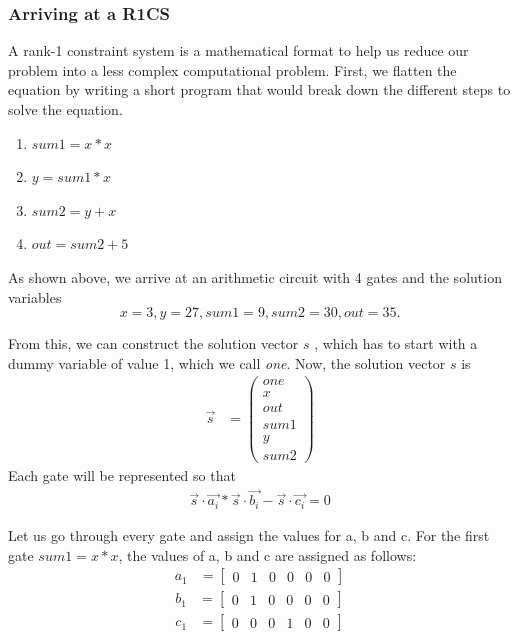 \subsubsection{Arriving at a R1CS}

A rank-1 constraint system is a mathematical format to help us reduce our problem into a less complex computational problem. First, we flatten the equation by writing a short program that would break down the different steps to solve the equation.

\begin{enumerate}
    \item \(sum1 = x * x\)
    \item \(y = sum1 * x\)
    \item \(sum2 = y + x\)
    \item \(out = sum2 + 5\)
\end{enumerate}

As shown above, we arrive at an arithmetic circuit with 4 gates and the solution variables
\[x = 3, y = 27, sum1 = 9, sum2 = 30, out = 35.\]

From this, we can construct the solution vector \(s\) , which has to start with a dummy variable of value 1, which we call \textit{one}.
Now, the solution vector \(s\) is
\begin{align}
    \Vec{s} &= \begin{pmatrix}
     one \\ x \\ out \\ sum1 \\ y \\ sum2
\end{pmatrix}
\end{align}
Each gate will be represented so that
\begin{align}
     \Vec{s}\cdot\Vec{a_i} * \Vec{s}\cdot\Vec{b_i} - \Vec{s}\cdot\Vec{c_i} = 0
\end{align}

Let us go through every gate and assign the values for a, b and c.
For the first gate \(sum1 = x*x\), the values of a, b and c are assigned as follows:
\begin{align*}
    a_1 &=\begin{bmatrix}
        0 & 1 & 0 & 0 & 0 & 0
    \end{bmatrix}
\end{align*}
\begin{align*}
    b_1&=\begin{bmatrix}
        0 & 1 & 0 & 0 & 0 & 0 
    \end{bmatrix}
\end{align*}
\begin{align*}
    c_1&=\begin{bmatrix}
        0 & 0 & 0 & 1 & 0 & 0
    \end{bmatrix}
\end{align*}

